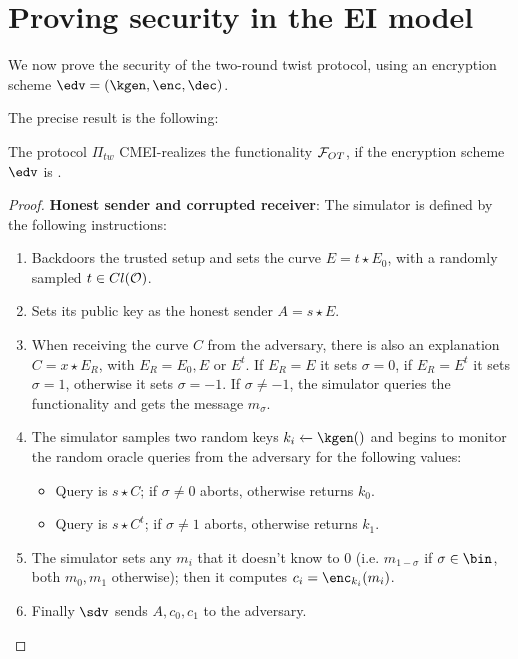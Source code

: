\section{Proving security in the EI model}
We now prove the security of the two-round twist protocol, using an encryption scheme $\edv=(\kgen, \enc, \dec)$.

The precise result is the following:

\begin{theorem}
    The protocol $\Pi_{tw}$ CMEI-realizes the functionality $\mathcal{F}_{OT}$, if the encryption scheme $\edv$ is \indcpa.
\end{theorem}
\begin{proof}
    \textbf{Honest sender and corrupted receiver}: The simulator is defined by the following instructions:
    \begin{enumerate}
        \item Backdoors the trusted setup and sets the curve $E=t\star E_0$, with a randomly sampled $t\in Cl(\mathcal{O})$.
        \item Sets its public key as the honest sender $A=s\star E$.
        \item When receiving the curve $C$ from the adversary, there is also an explanation $C=x\star E_R$, with $E_R=E_0,E$ or $E^t$. If $E_R=E$ it sets $\sigma=0$, if $E_R=E^t$ it sets $\sigma=1$, otherwise it sets $\sigma=-1$. If $\sigma\neq -1$, the simulator queries the functionality and gets the message $m_\sigma$.
        \item The simulator samples two random keys $k_i\xleftarrow{}\kgen()$ and begins to monitor the random oracle queries from the adversary for the following values:
        \begin{itemize}
            \item Query is $s\star C$; if $\sigma\neq0$ aborts, otherwise returns $k_0$.
            \item Query is $s\star C^t$; if $\sigma\neq1$ aborts, otherwise returns $k_1$.
        \end{itemize}
        \item The simulator sets any $m_i$ that it doesn't know to $0$ (i.e. $m_{1-\sigma}$ if $\sigma\in\bin$, both $m_0,m_1$ otherwise); then it computes $c_i=\enc_{k_i}(m_i)$.
        \item Finally $\sdv$ sends $A,c_0,c_1$ to the adversary.
    \end{enumerate}
    

\end{proof}
